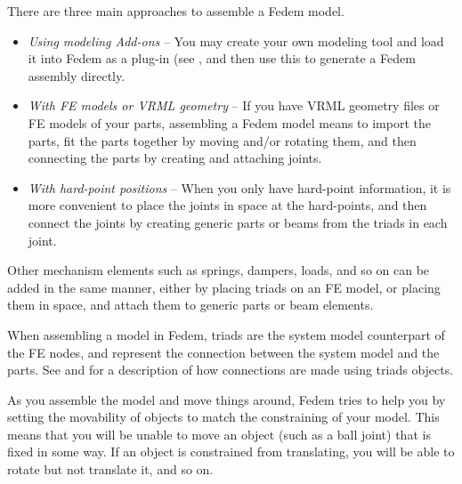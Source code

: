\clearpage



There are three main approaches to assemble a Fedem model.

\begin{itemize}
\item{\sl Using modeling Add-ons} -- You may
  create your own modeling tool and load it into Fedem as a plug-in (see
  ,
  and then use this to generate a Fedem assembly directly.
\item{\sl With FE models or VRML geometry} --
  If you have VRML geometry files or FE models of your parts, assembling a Fedem
  model means to import the parts, fit the parts together by moving and/or
  rotating them, and then connecting the parts by creating and attaching joints.
\item{\sl With hard-point positions} --
  When you only have hard-point information, it is more convenient to place the
  joints in space at the hard-points, and then connect the joints by creating
  generic parts or beams from the triads in each joint.
\end{itemize}

Other mechanism elements such as springs, dampers, loads, and so on can be added
in the same manner, either by placing triads on an FE model,
or placing them in space, and attach them to generic parts or beam elements.

When assembling a model in Fedem, triads are the system model counterpart of the
FE nodes, and represent the connection between the system model and the parts.
See  and
for a description of how connections are made using triads objects.

As you assemble the model and move things around, Fedem tries to help you by
setting the movability of objects to match the constraining of your model.
This means that you will be unable to move an object (such as a ball joint)
that is fixed in some way. If an object is constrained from translating,
you will be able to rotate but not translate it, and so on.



